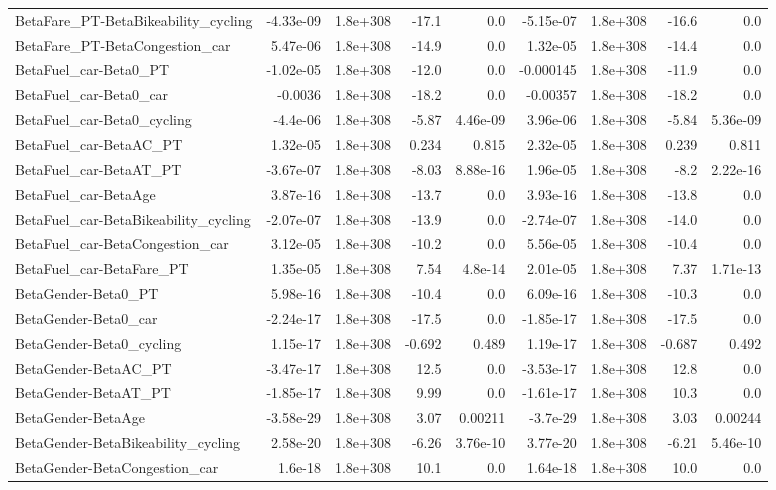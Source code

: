 \begin{tabular}{lrrrrrrrr}
BetaFare_PT-BetaBikeability_cycling & -4.33e-09 & 1.8e+308 & -17.1 & 0.0 & -5.15e-07 & 1.8e+308 & -16.6 & 0.0 \\
BetaFare_PT-BetaCongestion_car & 5.47e-06 & 1.8e+308 & -14.9 & 0.0 & 1.32e-05 & 1.8e+308 & -14.4 & 0.0 \\
BetaFuel_car-Beta0_PT & -1.02e-05 & 1.8e+308 & -12.0 & 0.0 & -0.000145 & 1.8e+308 & -11.9 & 0.0 \\
BetaFuel_car-Beta0_car & -0.0036 & 1.8e+308 & -18.2 & 0.0 & -0.00357 & 1.8e+308 & -18.2 & 0.0 \\
BetaFuel_car-Beta0_cycling & -4.4e-06 & 1.8e+308 & -5.87 & 4.46e-09 & 3.96e-06 & 1.8e+308 & -5.84 & 5.36e-09 \\
BetaFuel_car-BetaAC_PT & 1.32e-05 & 1.8e+308 & 0.234 & 0.815 & 2.32e-05 & 1.8e+308 & 0.239 & 0.811 \\
BetaFuel_car-BetaAT_PT & -3.67e-07 & 1.8e+308 & -8.03 & 8.88e-16 & 1.96e-05 & 1.8e+308 & -8.2 & 2.22e-16 \\
BetaFuel_car-BetaAge & 3.87e-16 & 1.8e+308 & -13.7 & 0.0 & 3.93e-16 & 1.8e+308 & -13.8 & 0.0 \\
BetaFuel_car-BetaBikeability_cycling & -2.07e-07 & 1.8e+308 & -13.9 & 0.0 & -2.74e-07 & 1.8e+308 & -14.0 & 0.0 \\
BetaFuel_car-BetaCongestion_car & 3.12e-05 & 1.8e+308 & -10.2 & 0.0 & 5.56e-05 & 1.8e+308 & -10.4 & 0.0 \\
BetaFuel_car-BetaFare_PT & 1.35e-05 & 1.8e+308 & 7.54 & 4.8e-14 & 2.01e-05 & 1.8e+308 & 7.37 & 1.71e-13 \\
BetaGender-Beta0_PT & 5.98e-16 & 1.8e+308 & -10.4 & 0.0 & 6.09e-16 & 1.8e+308 & -10.3 & 0.0 \\
BetaGender-Beta0_car & -2.24e-17 & 1.8e+308 & -17.5 & 0.0 & -1.85e-17 & 1.8e+308 & -17.5 & 0.0 \\
BetaGender-Beta0_cycling & 1.15e-17 & 1.8e+308 & -0.692 & 0.489 & 1.19e-17 & 1.8e+308 & -0.687 & 0.492 \\
BetaGender-BetaAC_PT & -3.47e-17 & 1.8e+308 & 12.5 & 0.0 & -3.53e-17 & 1.8e+308 & 12.8 & 0.0 \\
BetaGender-BetaAT_PT & -1.85e-17 & 1.8e+308 & 9.99 & 0.0 & -1.61e-17 & 1.8e+308 & 10.3 & 0.0 \\
BetaGender-BetaAge & -3.58e-29 & 1.8e+308 & 3.07 & 0.00211 & -3.7e-29 & 1.8e+308 & 3.03 & 0.00244 \\
BetaGender-BetaBikeability_cycling & 2.58e-20 & 1.8e+308 & -6.26 & 3.76e-10 & 3.77e-20 & 1.8e+308 & -6.21 & 5.46e-10 \\
BetaGender-BetaCongestion_car & 1.6e-18 & 1.8e+308 & 10.1 & 0.0 & 1.64e-18 & 1.8e+308 & 10.0 & 0.0 \\

\end{tabular}
